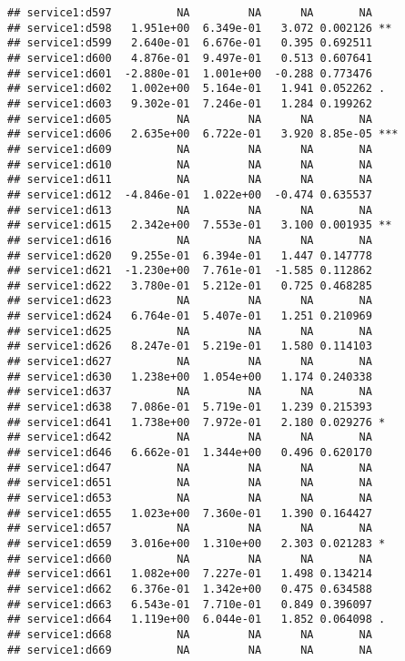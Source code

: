 \documentclass[
]{article}
\begin{document}
\begin{verbatim}
## service1:d597          NA         NA      NA       NA    
## service1:d598   1.951e+00  6.349e-01   3.072 0.002126 ** 
## service1:d599   2.640e-01  6.676e-01   0.395 0.692511    
## service1:d600   4.876e-01  9.497e-01   0.513 0.607641    
## service1:d601  -2.880e-01  1.001e+00  -0.288 0.773476    
## service1:d602   1.002e+00  5.164e-01   1.941 0.052262 .  
## service1:d603   9.302e-01  7.246e-01   1.284 0.199262    
## service1:d605          NA         NA      NA       NA    
## service1:d606   2.635e+00  6.722e-01   3.920 8.85e-05 ***
## service1:d609          NA         NA      NA       NA    
## service1:d610          NA         NA      NA       NA    
## service1:d611          NA         NA      NA       NA    
## service1:d612  -4.846e-01  1.022e+00  -0.474 0.635537    
## service1:d613          NA         NA      NA       NA    
## service1:d615   2.342e+00  7.553e-01   3.100 0.001935 ** 
## service1:d616          NA         NA      NA       NA    
## service1:d620   9.255e-01  6.394e-01   1.447 0.147778    
## service1:d621  -1.230e+00  7.761e-01  -1.585 0.112862    
## service1:d622   3.780e-01  5.212e-01   0.725 0.468285    
## service1:d623          NA         NA      NA       NA    
## service1:d624   6.764e-01  5.407e-01   1.251 0.210969    
## service1:d625          NA         NA      NA       NA    
## service1:d626   8.247e-01  5.219e-01   1.580 0.114103    
## service1:d627          NA         NA      NA       NA    
## service1:d630   1.238e+00  1.054e+00   1.174 0.240338    
## service1:d637          NA         NA      NA       NA    
## service1:d638   7.086e-01  5.719e-01   1.239 0.215393    
## service1:d641   1.738e+00  7.972e-01   2.180 0.029276 *  
## service1:d642          NA         NA      NA       NA    
## service1:d646   6.662e-01  1.344e+00   0.496 0.620170    
## service1:d647          NA         NA      NA       NA    
## service1:d651          NA         NA      NA       NA    
## service1:d653          NA         NA      NA       NA    
## service1:d655   1.023e+00  7.360e-01   1.390 0.164427    
## service1:d657          NA         NA      NA       NA    
## service1:d659   3.016e+00  1.310e+00   2.303 0.021283 *  
## service1:d660          NA         NA      NA       NA    
## service1:d661   1.082e+00  7.227e-01   1.498 0.134214    
## service1:d662   6.376e-01  1.342e+00   0.475 0.634588    
## service1:d663   6.543e-01  7.710e-01   0.849 0.396097    
## service1:d664   1.119e+00  6.044e-01   1.852 0.064098 .  
## service1:d668          NA         NA      NA       NA    
## service1:d669          NA         NA      NA       NA    

\end{verbatim}
\end{document}
